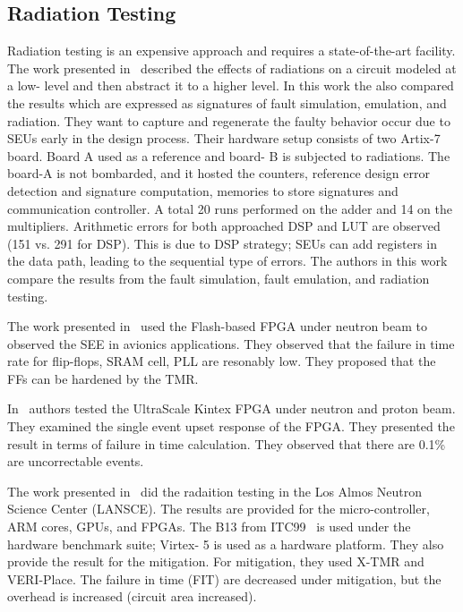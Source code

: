 \subsection{Radiation Testing}
Radiation testing is an expensive approach and requires a state-of-the-art facility. The work presented in~\cite{hobeika2014multi} described the effects of radiations on a circuit modeled at a low- level and then abstract it to a  higher level. In this work the also compared the results which are expressed as signatures of fault simulation, emulation, and radiation. They  want to capture and regenerate the faulty behavior occur due to SEUs early in the design process. Their hardware setup consists of two Artix-7 board. Board A used as a reference and board- B is subjected to radiations. The board-A is not bombarded, and it hosted the counters, reference design error detection and signature computation, memories to store signatures and communication controller. A total 20 runs performed on the adder and 14 on the multipliers. Arithmetic errors for both approached DSP and LUT are observed (151 vs. 291 for DSP). This is due to DSP strategy; SEUs can add registers in the data path, leading to the sequential type of errors. The authors in this work compare the results from the fault simulation, fault emulation, and radiation testing. 



The work presented in~\cite{dsilva2015neutron} used the Flash-based FPGA under neutron beam to observed the SEE in avionics applications. They observed that the failure in time rate for flip-flops, SRAM cell, PLL are resonably low. They proposed that the FFs can be hardened by the TMR. 

In~\cite{maillard2015neutron} authors tested the UltraScale Kintex FPGA under neutron and proton beam. They examined the single event upset response of the FPGA. They presented the result in terms of failure in time calculation. They observed that  there are 0.1\% are uncorrectable events. 


The work presented in~\cite{quinn2015using} did the radaition testing in the Los Almos Neutron Science Center (LANSCE). The results are provided for the micro-controller, ARM cores, GPUs, and FPGAs. The B13 from ITC99~\cite{ITC} is used under the hardware benchmark suite; Virtex- 5 is used as a hardware platform. They also provide the result for the mitigation. For mitigation, they used X-TMR and VERI-Place. The failure in time (FIT) are decreased under mitigation, but the overhead is increased (circuit area increased).

